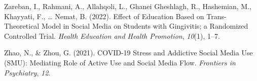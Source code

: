 \documentclass[
  man]{apa6}
\newlength{\cslhangindent}
\newlength{\cslentryspacingunit} %
\newenvironment{CSLReferences}[2] %
 {%
  \setlength{\parindent}{0pt}
  \ifodd #1
  \let\oldpar\par
  \def\par{\hangindent=\cslhangindent\oldpar}
  \fi
  \setlength{\parskip}{#2\cslentryspacingunit}
 }%
 {}
\begin{document}
\begin{CSLReferences}{1}{0}
\leavevmode{}%
Zareban, I., Rahmani, A., Allahqoli, L., Ghanei Gheshlagh, R., Hashemian, M., Khayyati, F., \ldots{} Nemat, B. (2022). Effect of {Education Based} on {Trans-Theoretical Model} in {Social Media} on {Students} with {Gingivitis}; a {Randomized Controlled Trial}. \emph{Health Education and Health Promotion}, \emph{10}(1), 1--7.

\leavevmode{}%
Zhao, N., \& Zhou, G. (2021). {COVID-19 Stress} and {Addictive Social Media Use} ({SMU}): {Mediating Role} of {Active Use} and {Social Media Flow}. \emph{Frontiers in Psychiatry}, \emph{12}.

\end{CSLReferences}
\end{document}
